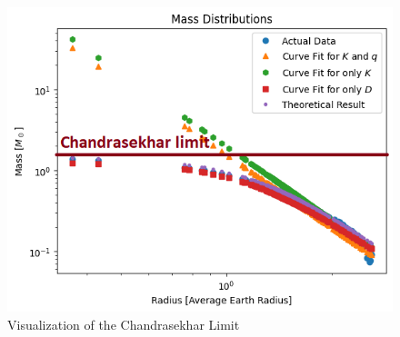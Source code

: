 \documentclass[letterpaper,12pt]{article}
\begin{document}
\begin{figure}[H] 
   \centering \includegraphics[width=0.7\columnwidth]{figures/7_n_ll_ms_r_chandrasekhar.png}           
                \caption{Visualization of the Chandrasekhar Limit}                
                   \label{fig:chandrasekhar}
   \end{figure}
\end{document}
